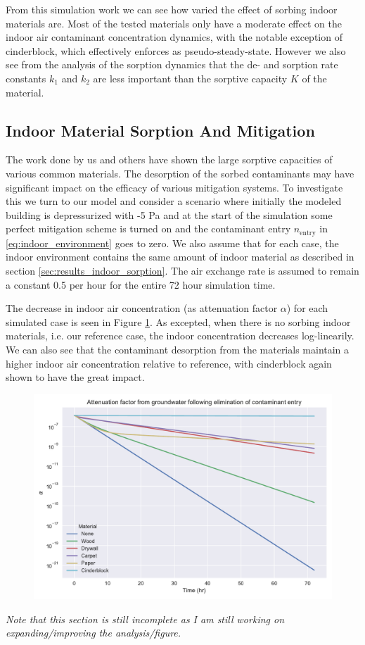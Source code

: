 From this simulation work we can see how varied the effect of sorbing indoor materials are.
Most of the tested materials only have a moderate effect on the indoor air contaminant concentration dynamics, with the notable exception of cinderblock, which effectively enforces as pseudo-steady-state.
However we also see from the analysis of the sorption dynamics that the de- and sorption rate constants $k_1$ and $k_2$ are less important than the sorptive capacity $K$ of the material.\par

\subsection{Indoor Material Sorption And Mitigation}\label{sec:results_indoor_mitigation}

The work done by us and others have shown the large sorptive capacities of various common materials.
The desorption of the sorbed contaminants may have significant impact on the efficacy of various mitigation systems.
To investigate this we turn to our model and consider a scenario where initially the modeled building is depressurized with -5 Pa and at the start of the simulation some perfect mitigation scheme is  turned on and the contaminant entry $n_\mathrm{entry}$ in \eqref{eq:indoor_environment} goes to zero.
We also assume that for each case, the indoor environment contains the same amount of indoor material as described in section \ref{sec:results_indoor_sorption}.
The air exchange rate is assumed to remain a constant 0.5 per hour for the entire 72 hour simulation time.\par %

The decrease in indoor air concentration (as attenuation factor $\alpha$) for each simulated case is seen in Figure \ref{fig:sorption_mitigation}.
As excepted, when there is no sorbing indoor materials, i.e. our reference case, the indoor concentration decreases log-linearily.
We can also see that the contaminant desorption from the materials maintain a higher indoor air concentration relative to reference, with cinderblock again shown to have the great impact.\par

\begin{figure}[!htb]
  \includegraphics[width=\textwidth]{sorption_mitigation.pdf}
  \caption{}
  \label{fig:sorption_mitigation}
\end{figure}

\textit{Note that this section is still incomplete as I am still working on expanding/improving the analysis/figure.}
